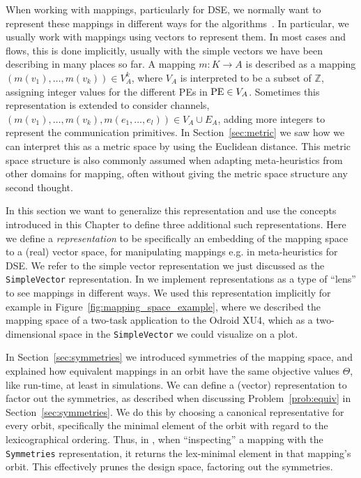 When working with mappings, particularly for \ac{DSE}, we normally want to represent these mappings in different ways for the algorithms~\cite{goens_mcsoc18}.
In particular, we usually work with mappings using vectors to represent them.
In most cases and flows, this is done implicitly, usually with the simple vectors we have been describing in many places so far.
A mapping $m : K \rightarrow A$ is described as a mapping $\left( m(v_1), \ldots, m(v_k) \right) \in V_A^k$, where $V_A$ is interpreted to be a subset of $\mathbb{Z}$, assigning integer values for the different \acp{PE} in $\operatorname{PE} \in V_A$.
Sometimes this representation is extended to consider channels, $\left( m(v_1), \ldots, m(v_k),m(e_1,\ldots,e_l) \right) \in V_A \cup E_A$, adding more integers to represent the communication primitives.
In Section~\ref{sec:metric} we saw how we can interpret this as a metric space by using the Euclidean distance.
This metric space structure is also commonly assumed when adapting meta-heuristics from other domains for mapping, often without giving the metric space structure any second thought.

In this section we want to generalize this representation and use the concepts introduced in this Chapter to define three additional such representations.
Here we define a \emph{representation} to be specifically an embedding of the mapping space to a (real) vector space, for manipulating mappings e.g. in meta-heuristics for \ac{DSE}. 
We refer to the simple vector representation we just discussed as the \texttt{SimpleVector} representation.
In \mocasin we implement representations as a type of ``lens'' to see mappings in different ways.
We used this representation implicitly for example in Figure~\ref{fig:mapping_space_example}, where we described the mapping space of a two-task application to the Odroid XU4, which as a two-dimensional space in the \texttt{SimpleVector} we could visualize on a plot.

In Section~\ref{sec:symmetries} we introduced symmetries of the mapping space, and explained how equivalent mappings in an orbit have the same objective values $\Theta$, like run-time, at least in simulations.
We can define a (vector) representation to factor out the symmetries, as described when discussing Problem~\ref{prob:equiv} in Section~\ref{sec:symmetries}.
We do this by choosing a canonical representative for every orbit, specifically the minimal element of the orbit with regard to the lexicographical ordering.
Thus, in \mocasin , when ``inspecting'' a mapping with the \texttt{Symmetries} representation, it returns the lex-minimal element in that mapping's orbit.
This effectively prunes the design space, factoring out the symmetries.

